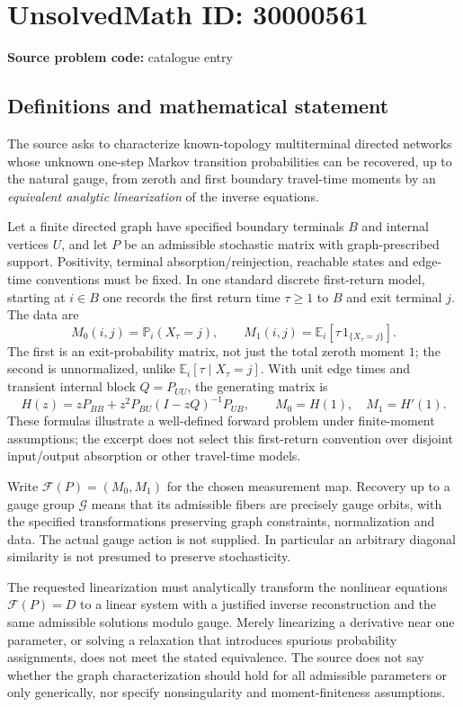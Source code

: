 \documentclass[11pt]{article}
\begin{document}
\section*{UnsolvedMath ID: 30000561}
\textbf{Source problem code:} catalogue entry
\subsection{Definitions and mathematical statement}
The source asks to characterize known-topology multiterminal directed networks whose unknown one-step Markov transition probabilities can be recovered, up to the natural gauge, from zeroth and first boundary travel-time moments by an \emph{equivalent analytic linearization} of the inverse equations.

Let a finite directed graph have specified boundary terminals $B$ and internal vertices $U$, and let $P$ be an admissible stochastic matrix with graph-prescribed support. Positivity, terminal absorption/reinjection, reachable states and edge-time conventions must be fixed. In one standard discrete first-return model, starting at $i\in B$ one records the first return time $\tau\geq1$ to $B$ and exit terminal $j$. The data are
\[
 M_0(i,j)=\mathbb P_i(X_\tau=j),\qquad
 M_1(i,j)=\mathbb E_i[\tau\,1_{\{X_\tau=j\}}].
\]
The first is an exit-probability matrix, not just the total zeroth moment $1$; the second is unnormalized, unlike $\mathbb E_i[\tau\mid X_\tau=j]$. With unit edge times and transient internal block $Q=P_{UU}$, the generating matrix is
\[
 H(z)=zP_{BB}+z^2P_{BU}(I-zQ)^{-1}P_{UB},
 \qquad M_0=H(1),\quad M_1=H'(1).
\]
These formulas illustrate a well-defined forward problem under finite-moment assumptions; the excerpt does not select this first-return convention over disjoint input/output absorption or other travel-time models.

Write $\mathcal F(P)=(M_0,M_1)$ for the chosen measurement map. Recovery up to a gauge group $\mathcal G$ means that its admissible fibers are precisely gauge orbits, with the specified transformations preserving graph constraints, normalization and data. The actual gauge action is not supplied. In particular an arbitrary diagonal similarity is not presumed to preserve stochasticity.

The requested linearization must analytically transform the nonlinear equations $\mathcal F(P)=D$ to a linear system with a justified inverse reconstruction and the same admissible solutions modulo gauge. Merely linearizing a derivative near one parameter, or solving a relaxation that introduces spurious probability assignments, does not meet the stated equivalence. The source does not say whether the graph characterization should hold for all admissible parameters or only generically, nor specify nonsingularity and moment-finiteness assumptions.
\end{document}
